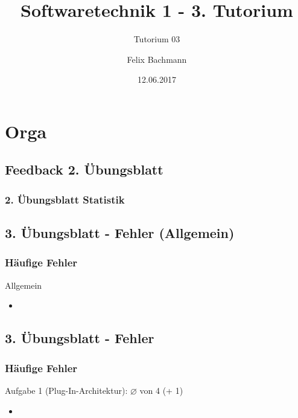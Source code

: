 \documentclass[18pt]{beamer}
\title[SWT1]{Softwaretechnik 1 - 3. Tutorium}
\subtitle{Tutorium 03}
\author{Felix Bachmann}
\date{12.06.2017}
\institute{KIT - Institut für Programmstrukturen und Datenorganisation (IPD)}
\begin{document}

\begin{frame}
\titlepage
\end{frame}

\begin{frame}
\tableofcontents
\end{frame}


\section{Orga}
	\subsection{Feedback 2. Übungsblatt}
	\begin{frame}
		\frametitle{2. Übungsblatt Statistik}
	\end{frame}
	
	\subsection{3. Übungsblatt - Fehler (Allgemein)}
	\begin{frame}
		\frametitle{Häufige Fehler}
		\begin{block}{Allgemein}
			\begin{itemize}
				\item 			%
			\end{itemize}
		\end{block}
	\end{frame}
	
	\subsection{3. Übungsblatt - Fehler}
	\begin{frame}
		\frametitle{Häufige Fehler}
		\begin{block}{Aufgabe 1 (Plug-In-Architektur): $\diameter$  von 4 (+ 1)} %
			\begin{itemize}
				\item %
			\end{itemize}
		\end{block}
	\end{frame}
\end{document}
